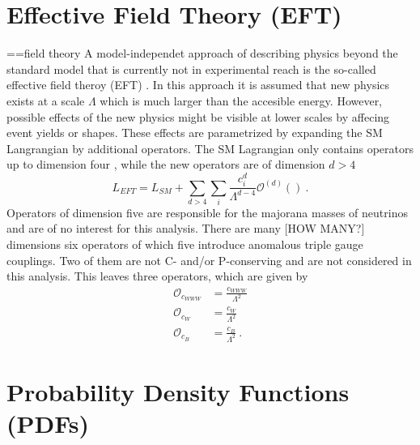 \section{Effective Field Theory (EFT)}
==field theory
A model-independet approach of describing physics beyond the standard model that is currently not in experimental reach is the so-called effective field theroy (EFT) \cite{EFT}. In this approach it is assumed that new physics exists at a scale $\Lambda$ which is much larger than the accesible energy. However, possible effects of the new physics might be visible at lower scales by affecing event yields or shapes. These effects are parametrized by expanding the SM Langrangian by additional operators. The SM Lagrangian only contains operators up to dimension four \cite{}, while the new operators are of dimension $d>4$
\begin{equation}
L_{EFT} = L_{SM} + \sum_{d>4} \sum_i \frac{c_i^d}{\Lambda^{d-4}}\mathcal{O}^{(d)}() ~.
\end{equation}
Operators of dimension five are responsible for the majorana masses of neutrinos \cite{nu_majo} and are of no interest for this analysis. There are many [HOW MANY?] dimensions six operators of which five introduce anomalous triple gauge couplings. Two of them are not C- and/or P-conserving and are not considered in this analysis. This leaves three operators, which are given by
\begin{align}
\mathcal{O}_{c_{WWW}} &= \frac{c_{WWW}}{\Lambda^2}\\
\mathcal{O}_{c_W} &= \frac{c_W}{\Lambda^2} \\
\mathcal{O}_{c_B} &= \frac{c_B}{\Lambda^2} ~.
\end{align}
\section{Probability Density Functions (PDFs)}